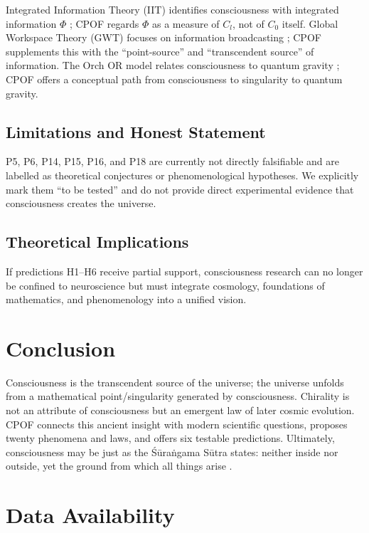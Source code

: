 \documentclass[11pt,a4paper]{article}
\begin{document}
Integrated Information Theory (IIT) identifies consciousness with integrated information $\Phi$ \cite{tononi2016}; CPOF regards $\Phi$ as a measure of $C_l$, not of $C_0$ itself. Global Workspace Theory (GWT) focuses on information broadcasting \cite{dehaene2014}; CPOF supplements this with the ``point-source'' and ``transcendent source'' of information. The Orch OR model relates consciousness to quantum gravity \cite{hameroff2014}; CPOF offers a conceptual path from consciousness to singularity to quantum gravity.

\subsection{Limitations and Honest Statement}

P5, P6, P14, P15, P16, and P18 are currently not directly falsifiable and are labelled as theoretical conjectures or phenomenological hypotheses. We explicitly mark them ``to be tested'' and do not provide direct experimental evidence that consciousness creates the universe.

\subsection{Theoretical Implications}

If predictions H1--H6 receive partial support, consciousness research can no longer be confined to neuroscience but must integrate cosmology, foundations of mathematics, and phenomenology into a unified vision.

\section{Conclusion}

Consciousness is the transcendent source of the universe; the universe unfolds from a mathematical point/singularity generated by consciousness. Chirality is not an attribute of consciousness but an emergent law of later cosmic evolution. CPOF connects this ancient insight with modern scientific questions, proposes twenty phenomena and laws, and offers six testable predictions. Ultimately, consciousness may be just as the Śūraṅgama Sūtra states: neither inside nor outside, yet the ground from which all things arise \cite{surangama}.

\section*{Data Availability}
\end{document}
